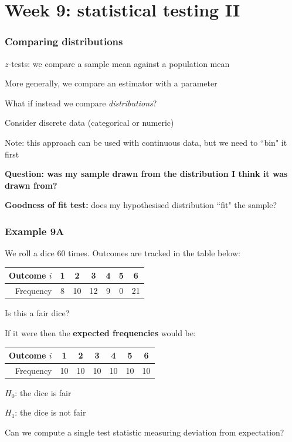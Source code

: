 \documentclass[t,8pt]{beamer}
\begin{document}

\section{Week 9: statistical testing II}

\begin{frame}
	\frametitle{Comparing distributions}
	$z$-tests: we compare a sample mean against a population mean \par
	More generally, we compare an estimator with a parameter \par
	What if instead we compare \emph{distributions}? \par
	Consider discrete data (categorical or numeric) \par
	Note: this approach can be used with continuous data, but we need to ``bin" it first \par
	{\bf Question: was my sample drawn from the distribution I think it was drawn from?} \par
	{\bf Goodness of fit test:} does my hypothesised distribution ``fit" the sample?
\end{frame}

\begin{frame}
	\frametitle{Example 9A}
	We roll a dice 60 times. Outcomes are tracked in the table below:
	\begin{center}
		\begin{tabular}{r|cccccc}
			Outcome $i$ & 1 & 2 & 3 & 4 & 5 & 6 \\ \hline
			Frequency & 8 & 10 & 12 & 9 & 0 & 21 \\
		\end{tabular}
	\end{center}
	Is this a fair dice? \par
	If it were then the {\bf expected frequencies} would be:
	\begin{center}
		\begin{tabular}{r|cccccc}
			Outcome $i$ & 1 & 2 & 3 & 4 & 5 & 6 \\ \hline
			Frequency & 10 & 10 & 10 & 10 & 10 & 10 \\
		\end{tabular}
	\end{center}
	$H_0$: the dice is fair \par
	$H_1$: the dice is not fair \par
	Can we compute a single test statistic measuring deviation from expectation?
\end{frame}
\end{document}
